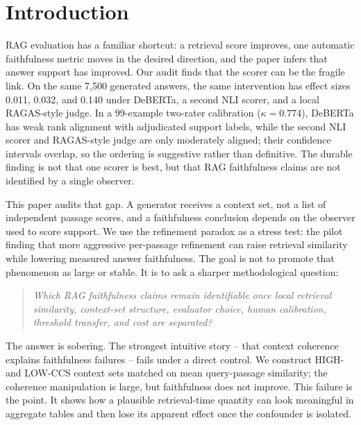 \section{Introduction}
\label{sec:introduction}

RAG evaluation has a familiar shortcut: a retrieval score improves, one
automatic faithfulness metric moves in the desired direction, and the paper
infers that answer support has improved. Our audit finds that the scorer can
be the fragile link. On the same 7,500 generated answers, the same intervention
has effect sizes 0.011, 0.032, and 0.140 under DeBERTa, a second NLI scorer,
and a local RAGAS-style judge. In a 99-example two-rater calibration
(\(\kappa=0.774\)), DeBERTa has weak rank alignment with adjudicated support
labels, while the second NLI scorer and RAGAS-style judge are only moderately
aligned; their confidence intervals overlap, so the ordering is suggestive
rather than definitive. The durable finding is not that one scorer is best,
but that RAG faithfulness claims are not identified by a single observer.

This paper audits that gap. A generator receives a context set, not a list of
independent passage scores, and a faithfulness conclusion depends on the
observer used to score support. We use the refinement paradox as a stress
test: the pilot finding that more aggressive per-passage refinement can raise
retrieval similarity while lowering measured answer faithfulness. The goal is
not to promote that phenomenon as large or stable. It is to ask a sharper
methodological question:

\begin{quote}
\emph{Which RAG faithfulness claims remain identifiable once local retrieval
similarity, context-set structure, evaluator choice, human calibration,
threshold transfer, and cost are separated?}
\end{quote}

The answer is sobering. The strongest intuitive story -- that context
coherence explains faithfulness failures -- fails under a direct control. We
construct HIGH- and LOW-CCS context sets matched on mean query-passage
similarity; the coherence manipulation is large, but faithfulness does not
improve. This failure is the point. It shows how a plausible retrieval-time
quantity can look meaningful in aggregate tables and then lose its apparent
effect once the confounder is isolated.

